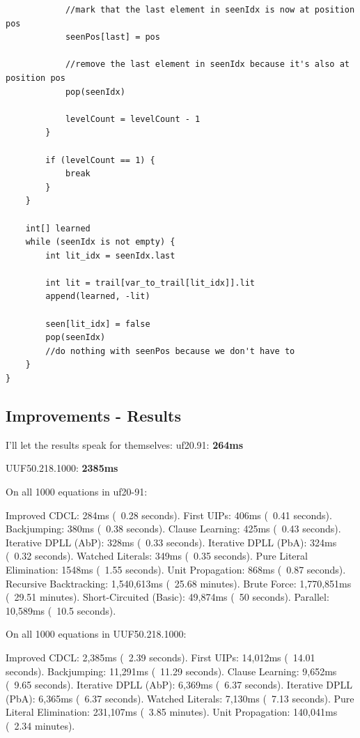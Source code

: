 \documentclass[../main.tex]{subfiles}
\begin{document}
\begin{lstlisting}
            //mark that the last element in seenIdx is now at position pos
            seenPos[last] = pos

            //remove the last element in seenIdx because it's also at position pos
            pop(seenIdx)

            levelCount = levelCount - 1
        }

        if (levelCount == 1) {
            break
        }
    }

    int[] learned
    while (seenIdx is not empty) {
        int lit_idx = seenIdx.last

        int lit = trail[var_to_trail[lit_idx]].lit
        append(learned, -lit)

        seen[lit_idx] = false
        pop(seenIdx)
        //do nothing with seenPos because we don't have to
    }
}
\end{lstlisting}

\subsection{Improvements - Results}

I'll let the results speak for themselves:
\noindent
uf20.91: \textbf{264ms}

\noindent
UUF50.218.1000: \textbf{2385ms}

\begin{FVerbatim}
On all 1000 equations in uf20-91:

Improved CDCL:             284ms (~0.28 seconds).
First UIPs:                406ms (~0.41 seconds).
Backjumping:               380ms (~0.38 seconds).
Clause Learning:           425ms (~0.43 seconds).
Iterative DPLL (AbP):      328ms (~0.33 seconds).
Iterative DPLL (PbA):      324ms (~0.32 seconds).
Watched Literals:          349ms (~0.35 seconds).
Pure Literal Elimination:  1548ms (~1.55 seconds).
Unit Propagation:          868ms (~0.87 seconds).
Recursive Backtracking:    1,540,613ms (~25.68 minutes).
Brute Force:               1,770,851ms (~29.51 minutes).
Short-Circuited (Basic):   49,874ms (~50 seconds).
Parallel:                  10,589ms (~10.5 seconds).

On all 1000 equations in UUF50.218.1000:

Improved CDCL:            2,385ms (~2.39 seconds).
First UIPs:               14,012ms (~14.01 seconds).
Backjumping:              11,291ms (~11.29 seconds).
Clause Learning:          9,652ms (~9.65 seconds).
Iterative DPLL (AbP):     6,369ms (~6.37 seconds).
Iterative DPLL (PbA):     6,365ms (~6.37 seconds).
Watched Literals:         7,130ms (~7.13 seconds).
Pure Literal Elimination: 231,107ms (~3.85 minutes).
Unit Propagation:         140,041ms (~2.34 minutes).
\end{FVerbatim}
\end{document}
